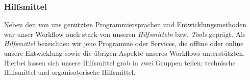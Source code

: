 
\subsubsection{Hilfsmittel}
\label{team:orga-workflow-tools}
\vspace{-0.3cm}

Neben den von uns genutzten Programmiersprachen und Entwicklungsmethoden war
unser Workflow auch stark von unseren \emph{Hilfsmitteln} bzw. \emph{Tools}
geprägt. Als \emph{Hilfsmittel} bezeichnen wir jene Programme oder Services, die
offline oder online unsere Entwicklung sowie die übrigen Aspekte unseres
Workflows unterstützten. Hierbei lassen sich unsere Hilfsmittel grob in zwei
Gruppen teilen: technische Hilfsmittel und organisatorische Hilfsmittel.

